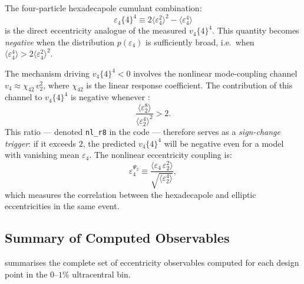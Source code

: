 \documentclass[12pt,a4paper,twoside]{report}
\newcommand{\mean}[1]{\langle #1 \rangle}
\begin{document}
The four-particle hexadecapole cumulant combination:
\begin{equation}
  \varepsilon_4\{4\}^4 \equiv 2\mean{\varepsilon_4^2}^2 - \mean{\varepsilon_4^4}
  \label{eq:e4_4c}
\end{equation}
is the direct eccentricity analogue of the measured $v_4\{4\}^4$.
This quantity becomes \emph{negative} when the distribution $p(\varepsilon_4)$
is sufficiently broad, i.e.\ when $\mean{\varepsilon_4^4} > 2\mean{\varepsilon_4^2}^2$.

The mechanism driving $v_4\{4\}^4 < 0$ involves the nonlinear
mode-coupling channel $v_4 \approx \chi_{42}\,v_2^2$, where
$\chi_{42}$ is the linear response coefficient.  The contribution of
this channel to $v_4\{4\}^4$ is negative whenever
\cite{Giacalone2017b}:
\begin{equation}
  \frac{\mean{\varepsilon_2^8}}{\mean{\varepsilon_2^4}^2} > 2.
  \label{eq:sign_change_trigger}
\end{equation}
This ratio — denoted \texttt{nl\_r8} in the code — therefore serves as
a \emph{sign-change trigger}: if it exceeds $2$, the predicted
$v_4\{4\}^4$ will be negative even for a model with vanishing mean
$\varepsilon_4$.  The nonlinear eccentricity coupling is:
\begin{equation}
  \varepsilon_4^{\Psi_2} \equiv
  \frac{\mean{\varepsilon_4\, \varepsilon_2^2}}{\sqrt{\mean{\varepsilon_2^4}}},
  \label{eq:e4_psi2}
\end{equation}
which measures the correlation between the hexadecapole and elliptic
eccentricities in the same event.

\subsection{Summary of Computed Observables}
\label{subsec:obs_summary}

 summarises the complete set of eccentricity
observables computed for each design point in the $0$--$1\%$
ultracentral bin.
\end{document}
